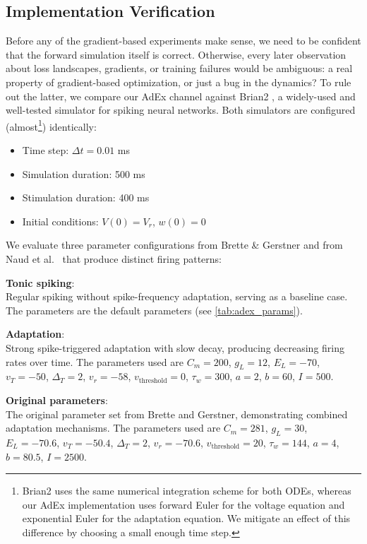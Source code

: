 \subsection{Implementation Verification}\label{sec:method:adex:verification}
Before any of the gradient-based experiments make sense, we need to be confident that the forward simulation itself is correct.
Otherwise, every later observation about loss landscapes, gradients, or training failures would be ambiguous: a real property of gradient-based optimization, or just a bug in the dynamics?
To rule out the latter, we compare our \gls{AdEx} channel against Brian2 \cite{Stimberg2019}, a widely-used and well-tested simulator for spiking neural networks.
Both simulators are configured (almost\footnote{Brian2 uses the same numerical integration scheme for both ODEs, whereas our AdEx implementation uses forward Euler for the voltage equation and exponential Euler for the adaptation equation. We mitigate an effect of this difference by choosing a small enough time step.}) identically:
\begin{itemize}
    \item Time step: $\Delta t = 0.01$ ms
    \item Simulation duration: 500 ms
    \item Stimulation duration: 400 ms
    \item Initial conditions: $V(0) = V_r$, $w(0) = 0$
\end{itemize}

We evaluate three parameter configurations from Brette \& Gerstner \cite{Brette2005} and from Naud et al.\ \cite{Naud2008} that produce distinct firing patterns:

\textbf{Tonic spiking}:\\
Regular spiking without spike-frequency adaptation, serving as a baseline case.
The parameters are the default parameters (see \cref{tab:adex_params}).

\textbf{Adaptation}:\\
Strong spike-triggered adaptation with slow decay, producing decreasing firing rates over time.
The parameters used are
$C_m = 200$,
$g_L = 12$,
$E_L = -70$,
$v_T = -50$,
$\Delta_T = 2$,
$v_r = -58$,
$v_{\text{threshold}} = 0$,
$\tau_w = 300$,
$a = 2$,
$b = 60$,
$I = 500$.

\textbf{Original parameters}:\\
The original parameter set from Brette and Gerstner, demonstrating combined adaptation mechanisms.
The parameters used are
$C_m = 281$,
$g_L = 30$,
$E_L = -70.6$,
$v_T = -50.4$,
$\Delta_T = 2$,
$v_r = -70.6$,
$v_{\text{threshold}} = 20$,
$\tau_w = 144$,
$a = 4$,
$b = 80.5$,
$I = 2500$.

